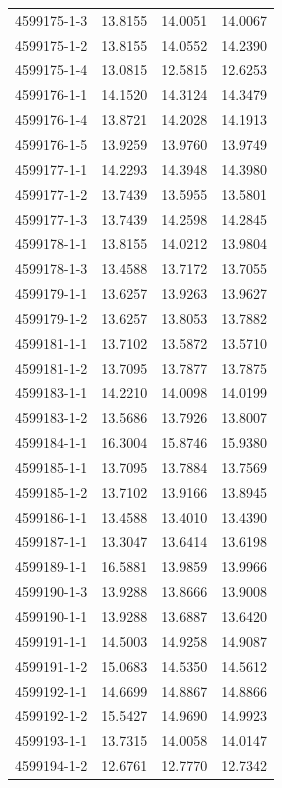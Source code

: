\begin{longtable}{lrrr}
4599175-1-3 & 13.8155 & 14.0051 & 14.0067 \\
4599175-1-2 & 13.8155 & 14.0552 & 14.2390 \\
4599175-1-4 & 13.0815 & 12.5815 & 12.6253 \\
4599176-1-1 & 14.1520 & 14.3124 & 14.3479 \\
4599176-1-4 & 13.8721 & 14.2028 & 14.1913 \\
4599176-1-5 & 13.9259 & 13.9760 & 13.9749 \\
4599177-1-1 & 14.2293 & 14.3948 & 14.3980 \\
4599177-1-2 & 13.7439 & 13.5955 & 13.5801 \\
4599177-1-3 & 13.7439 & 14.2598 & 14.2845 \\
4599178-1-1 & 13.8155 & 14.0212 & 13.9804 \\
4599178-1-3 & 13.4588 & 13.7172 & 13.7055 \\
4599179-1-1 & 13.6257 & 13.9263 & 13.9627 \\
4599179-1-2 & 13.6257 & 13.8053 & 13.7882 \\
4599181-1-1 & 13.7102 & 13.5872 & 13.5710 \\
4599181-1-2 & 13.7095 & 13.7877 & 13.7875 \\
4599183-1-1 & 14.2210 & 14.0098 & 14.0199 \\
4599183-1-2 & 13.5686 & 13.7926 & 13.8007 \\
4599184-1-1 & 16.3004 & 15.8746 & 15.9380 \\
4599185-1-1 & 13.7095 & 13.7884 & 13.7569 \\
4599185-1-2 & 13.7102 & 13.9166 & 13.8945 \\
4599186-1-1 & 13.4588 & 13.4010 & 13.4390 \\
4599187-1-1 & 13.3047 & 13.6414 & 13.6198 \\
4599189-1-1 & 16.5881 & 13.9859 & 13.9966 \\
4599190-1-3 & 13.9288 & 13.8666 & 13.9008 \\
4599190-1-1 & 13.9288 & 13.6887 & 13.6420 \\
4599191-1-1 & 14.5003 & 14.9258 & 14.9087 \\
4599191-1-2 & 15.0683 & 14.5350 & 14.5612 \\
4599192-1-1 & 14.6699 & 14.8867 & 14.8866 \\
4599192-1-2 & 15.5427 & 14.9690 & 14.9923 \\
4599193-1-1 & 13.7315 & 14.0058 & 14.0147 \\
4599194-1-2 & 12.6761 & 12.7770 & 12.7342 \\

\end{longtable}
